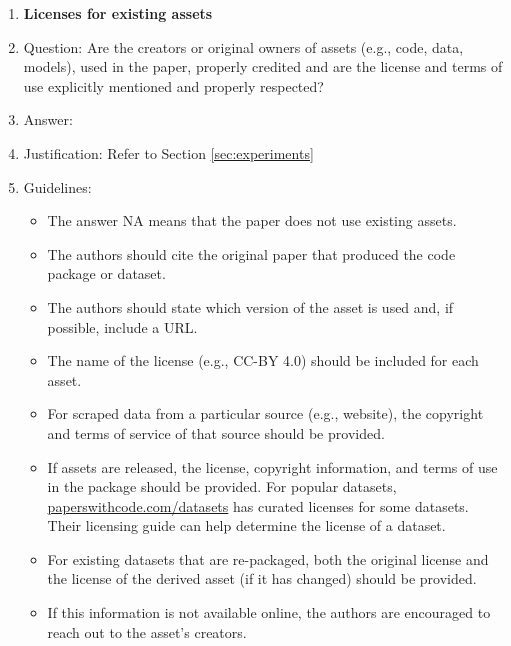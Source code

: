 \documentclass{article}
\begin{document}
\begin{enumerate}
\item {\bf Licenses for existing assets}
    \item[] Question: Are the creators or original owners of assets (e.g., code, data, models), used in the paper, properly credited and are the license and terms of use explicitly mentioned and properly respected?
    \item[] Answer: \answerYes{} %
    \item[] Justification: Refer to Section \ref{sec:experiments}
    \item[] Guidelines:
    \begin{itemize}
        \item The answer NA means that the paper does not use existing assets.
        \item The authors should cite the original paper that produced the code package or dataset.
        \item The authors should state which version of the asset is used and, if possible, include a URL.
        \item The name of the license (e.g., CC-BY 4.0) should be included for each asset.
        \item For scraped data from a particular source (e.g., website), the copyright and terms of service of that source should be provided.
        \item If assets are released, the license, copyright information, and terms of use in the package should be provided. For popular datasets, \url{paperswithcode.com/datasets} has curated licenses for some datasets. Their licensing guide can help determine the license of a dataset.
        \item For existing datasets that are re-packaged, both the original license and the license of the derived asset (if it has changed) should be provided.
        \item If this information is not available online, the authors are encouraged to reach out to the asset's creators.
    \end{itemize}


\end{enumerate}
\end{document}
